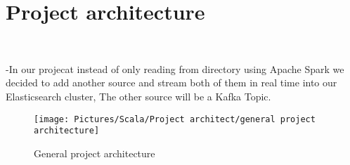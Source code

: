 \chapter{Project architecture}

\setlength{\parindent}{0.5em}
\setlength{\parskip}{1em}
\\
\par 
-In our projecat instead of only reading from directory using Apache Spark we decided to add another source and stream both of them in real time into our Elasticsearch cluster, The other source will be a Kafka Topic.\\

\begin{figure}[!htb] 
\begin{center} 
\texttt{[image: Pictures/Scala/Project architect/general project architecture]} 
\end{center} 
\caption{General project architecture}
\label{fig:architcture}
\end{figure}  \FloatBarrier


